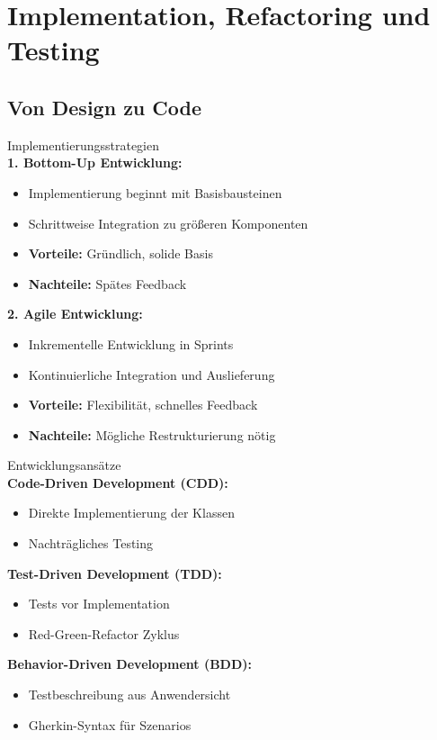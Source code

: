 \section{Implementation, Refactoring und Testing}

\subsection{Von Design zu Code}

\begin{concept}{Implementierungsstrategien}\\
\textbf{1. Bottom-Up Entwicklung:}
\begin{itemize}
    \item Implementierung beginnt mit Basisbausteinen
    \item Schrittweise Integration zu größeren Komponenten
    \item \textbf{Vorteile:} Gründlich, solide Basis
    \item \textbf{Nachteile:} Spätes Feedback
\end{itemize}

\textbf{2. Agile Entwicklung:}
\begin{itemize}
    \item Inkrementelle Entwicklung in Sprints
    \item Kontinuierliche Integration und Auslieferung
    \item \textbf{Vorteile:} Flexibilität, schnelles Feedback
    \item \textbf{Nachteile:} Mögliche Restrukturierung nötig
\end{itemize}
\end{concept}

\begin{definition}{Entwicklungsansätze}\\
\textbf{Code-Driven Development (CDD):}
\begin{itemize}
    \item Direkte Implementierung der Klassen
    \item Nachträgliches Testing
\end{itemize}

\textbf{Test-Driven Development (TDD):}
\begin{itemize}
    \item Tests vor Implementation
    \item Red-Green-Refactor Zyklus
\end{itemize}

\textbf{Behavior-Driven Development (BDD):}
\begin{itemize}
    \item Testbeschreibung aus Anwendersicht
    \item Gherkin-Syntax für Szenarios
\end{itemize}
\end{definition}

